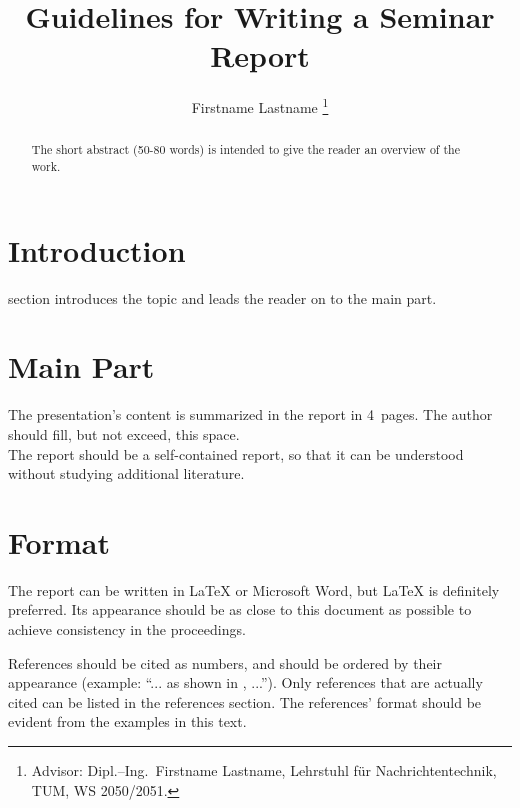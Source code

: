 \documentclass[journal, a4paper]{IEEEtran}
\begin{document}
	
	\title{Guidelines for Writing a Seminar Report}
	\author{Firstname Lastname
		\thanks{Advisor: Dipl.--Ing.~Firstname Lastname, Lehrstuhl f\"ur Nachrichtentechnik, TUM, WS 2050/2051.}}
	\maketitle
	
	\begin{abstract}
		The short abstract (50-80 words) is intended to give the reader an overview of the work.
	\end{abstract}
	
	\section{Introduction}
	 section introduces the topic and leads the reader on to the main part.
	
	\section{Main Part}
	The presentation's content is summarized in the report in 4~pages.
	The author should fill, but not exceed, this space. \\
	The report should be a self-contained report, so that it can be understood without studying additional literature.
	
	\section{Format}
	The report can be written in \LaTeX{} or Microsoft Word, but \LaTeX{} is definitely preferred.
	Its appearance should be as close to this document as possible to achieve consistency in the proceedings.
	
	References should be cited as numbers, and should be ordered by their appearance (example: ``... as shown in \cite{HOP96}, ...'').
	Only references that are actually cited can be listed in the references section.
	The references' format should be evident from the examples in this text.
	
\end{document}
